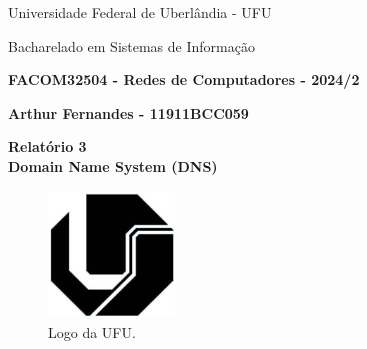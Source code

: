 \documentclass[12pt,a4paper]{report}
\begin{document}
	\begin{center}
		{\Large Universidade Federal de Uberlândia - UFU}
		
		Bacharelado em Sistemas de Informação
		
		\textbf{FACOM32504 - Redes de Computadores - 2024/2}
		
		\textbf{Arthur Fernandes - 11911BCC059}
	\end{center}
	
	\vspace{10pt}

	\begin{center}
		{\LARGE \textbf{Relatório 3 \\ \vspace{10pt} Domain Name System (DNS)}}
	\end{center}
	
	\vspace{10pt}
	
	\begin{figure}[ht]
		\centering
		\includegraphics[width=0.3\textwidth]{ufu.png}
		\caption{Logo da UFU.}
		\label{fig:logoUFU1}
	\end{figure}
\end{document}

